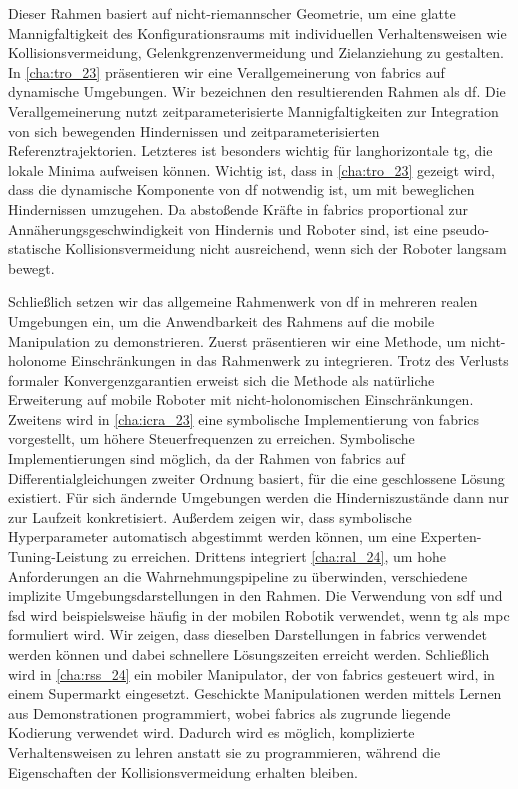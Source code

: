 Dieser Rahmen basiert auf nicht-riemannscher Geometrie, um eine glatte
Mannigfaltigkeit des Konfigurationsraums mit individuellen Verhaltensweisen wie
Kollisionsvermeidung, Gelenkgrenzenvermeidung und Zielanziehung zu gestalten. In
\cref{cha:tro_23} präsentieren wir eine Verallgemeinerung von \ac{fabrics} auf
dynamische Umgebungen. Wir bezeichnen den resultierenden Rahmen als \ac{df}. Die
Verallgemeinerung nutzt zeitparameterisierte Mannigfaltigkeiten zur Integration
von sich bewegenden Hindernissen und zeitparameterisierten Referenztrajektorien.
Letzteres ist besonders wichtig für langhorizontale \ac{tg}, die lokale Minima
aufweisen können. Wichtig ist, dass in \cref{cha:tro_23} gezeigt wird, dass die
dynamische Komponente von \ac{df} notwendig ist, um mit beweglichen Hindernissen
umzugehen. Da abstoßende Kräfte in \ac{fabrics} proportional zur
Annäherungsgeschwindigkeit von Hindernis und Roboter sind, ist eine
pseudo-statische Kollisionsvermeidung nicht ausreichend, wenn sich der Roboter
langsam bewegt.

Schließlich setzen wir das allgemeine Rahmenwerk von \ac{df} in mehreren realen
Umgebungen ein, um die Anwendbarkeit des Rahmens auf die mobile Manipulation zu
demonstrieren. Zuerst präsentieren wir eine Methode, um nicht-holonome
Einschränkungen in das Rahmenwerk zu integrieren. Trotz des Verlusts formaler
Konvergenzgarantien erweist sich die Methode als natürliche Erweiterung auf
mobile Roboter mit nicht-holonomischen Einschränkungen. Zweitens wird in
\cref{cha:icra_23} eine symbolische Implementierung von \ac{fabrics}
vorgestellt, um höhere Steuerfrequenzen zu erreichen. Symbolische
Implementierungen sind möglich, da der Rahmen von \ac{fabrics} auf
Differentialgleichungen zweiter Ordnung basiert, für die eine geschlossene
Lösung existiert. Für sich ändernde Umgebungen werden die Hinderniszustände dann
nur zur Laufzeit konkretisiert. Außerdem zeigen wir, dass symbolische
Hyperparameter automatisch abgestimmt werden können, um eine
Experten-Tuning-Leistung zu erreichen. Drittens integriert \cref{cha:ral_24}, um
hohe Anforderungen an die Wahrnehmungspipeline zu überwinden, verschiedene
implizite Umgebungsdarstellungen in den Rahmen. Die Verwendung von \ac{sdf} und
\ac{fsd} wird beispielsweise häufig in der mobilen Robotik verwendet, wenn
\ac{tg} als \ac{mpc} formuliert wird. Wir zeigen, dass dieselben Darstellungen
in \ac{fabrics} verwendet werden können und dabei schnellere Lösungszeiten
erreicht werden. Schließlich wird in \cref{cha:rss_24} ein mobiler Manipulator,
der von \ac{fabrics} gesteuert wird, in einem Supermarkt eingesetzt. Geschickte
Manipulationen werden mittels Lernen aus Demonstrationen programmiert, wobei
\ac{fabrics} als zugrunde liegende Kodierung verwendet wird. Dadurch wird es
möglich, komplizierte Verhaltensweisen zu lehren anstatt sie zu programmieren,
während die Eigenschaften der Kollisionsvermeidung erhalten bleiben.

